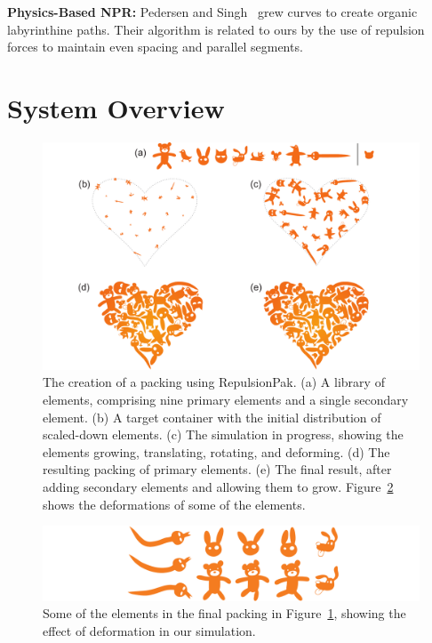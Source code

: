 \newtext
{
\textbf{Physics-Based NPR:} Pedersen and
Singh~\cite{Pedersen2006} grew curves to create organic
labyrinthine paths. Their algorithm is related to ours by the use
of repulsion forces to maintain even spacing and parallel segments.
}

\section{System Overview}
\label{repulsionpak_system_overview}




\begin{figure}[h]
\centering
\includegraphics[width=1.0\textwidth]{figures/repulsionpak/pipeline.pdf} 
\caption[RepulsionPak pipeline]
{\label{fig_repulsionpak_pipeline} 
The creation of a packing using RepulsionPak.
  (a) A library of elements, comprising nine primary elements and a single
  	secondary element.
  (b) A target container with the initial distribution of scaled-down elements.
  (c) The simulation in progress, showing the elements growing, translating,
  	rotating, and deforming.
  (d) The resulting packing of primary elements.
  (e) The final result, after adding secondary elements and allowing them to
  	grow.
  	Figure~\ref{fig_defviz} shows the deformations of some of the elements. }
\end{figure}

\begin{figure}[h]
\centering
\includegraphics[width=1.0\textwidth]{figures/repulsionpak/pipeline_defviz_csk.pdf}
\caption[Element deformation]{
	\label{fig_defviz}
	Some of the elements in the final packing in Figure~\ref{fig_repulsionpak_pipeline}, 
	showing the effect of deformation in our simulation.
}
\end{figure}

